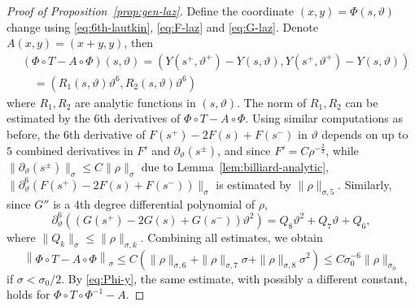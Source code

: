 \documentclass[12pt,reqno]{amsart}
\theoremstyle{remark}
\begin{document}
\begin{proof}
[Proof of Proposition~\ref{prop:gen-laz}]
Define the coordinate $(x, y) = \Phi(s, \vartheta)$ change using \eqref{eq:6th-lautkin}, \eqref{eq:F-laz} and \eqref{eq:G-laz}.
Denote $A(x, y) = (x + y, y)$, then 
\[
\begin{aligned}
  & 	(\Phi \circ T - A \circ \Phi) (s, \vartheta) = (Y(s^+, \vartheta^+) - Y(s, \vartheta), Y(s^+, \vartheta^+) - Y(s, \vartheta))  \\
  & \quad = (R_1(s, \vartheta) \vartheta^6, R_2(s, \vartheta) \vartheta^6)
\end{aligned}
\]
where $R_1, R_2$ are analytic functions in $(s, \vartheta)$. The norm of $R_1, R_2$ can be estimated by the $6$th derivatives of $\Phi \circ T - A \circ \Phi$. 
Using similar computations as before, the $6$th derivative of $F(s^+)- 2F(s) + F(s^-)$ in $\vartheta$ depends on up to $5$ combined derivatives in $F'$ and $\partial_\vartheta(s^\pm)$, and since $F' = C \rho^{-\frac23}$, while $\|\partial_\vartheta(s^\pm)\|_\sigma \le C\|\rho\|_\sigma$  due to Lemma~\ref{lem:billiard-analytic}, $\|\partial^6_\vartheta\left( F(s^+)- 2F(s) + F(s^-) \right)\|_\sigma$ is estimated by $\|\rho\|_{\sigma, 5}$. Similarly, since $G''$ is a  $4$th degree differential polynomial of $\rho$, 
\[
\partial^6_\vartheta\left( \left( G(s^+) - 2G(s) + G(s^-) \right) \vartheta^2 \right) = Q_8 \vartheta^2 + Q_7 \vartheta + Q_6,
\]
where $\|Q_k\|_\sigma \le \|\rho\|_{\sigma, k}$. Combining all estimates, we obtain 
\[
	\left\|  \Phi \circ T - A \circ \Phi  \right\|_{\sigma} \le 
	C \left( \|\rho\|_{\sigma, 6} + \|\rho\|_{\sigma, 7} \sigma + \|\rho\|_{\sigma, 8} \sigma^2  \right) \le C \sigma_0^{-6} \|\rho\|_{\sigma_0}
\]
if $\sigma < \sigma_0/2$. By \eqref{eq:Phi-y}, the same estimate, with possibly a different constant, holds for $\Phi \circ T \circ \Phi^{-1} - A$. 
\end{proof}



\end{document}

